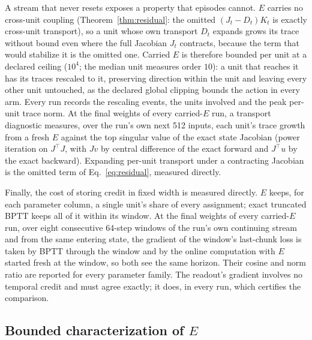 \documentclass[11pt]{article}
\theoremstyle{definition}
\begin{document}
A stream that never resets exposes a property that episodes cannot. $E$ carries
no cross-unit coupling (Theorem~\ref{thm:residual}: the omitted
$(J_t-D_t)K_t$ is exactly cross-unit transport), so a unit whose own transport
$D_t$ expands grows its trace without bound even where the full Jacobian $J_t$
contracts, because the term that would stabilize it is the omitted one. Carried $E$
is therefore bounded per unit at a declared ceiling ($10^4$; the median unit measures
order $10$): a unit that reaches it has its traces rescaled to it, preserving
direction within the unit and leaving every other unit untouched, as the declared
global clipping bounds the action in every arm. Every run records the rescaling
events, the units involved and the peak per-unit trace norm. At the final weights
of every carried-$E$ run, a transport diagnostic measures, over the run's own next
512 inputs, each unit's trace growth from a fresh $E$ against the top singular value
of the exact state Jacobian (power iteration on $J^\top J$, with $Jv$ by central
difference of the exact forward and $J^\top u$ by the exact backward). Expanding
per-unit transport under a contracting Jacobian is the omitted term of
Eq.~\eqref{eq:residual}, measured directly.

Finally, the cost of storing credit in fixed width is measured directly. $E$ keeps,
for each parameter column, a single unit's share of every assignment; exact
truncated BPTT keeps all of it within its window. At the final weights of every
carried-$E$ run, over eight consecutive 64-step windows of the run's own
continuing stream and from the same entering state, the gradient of the window's
last-chunk loss is taken by BPTT through the window and by the online computation
with $E$ started fresh at the window, so both see the same horizon. Their cosine and
norm ratio are reported for every parameter family. The readout's gradient involves
no temporal credit and must agree exactly; it does, in every run, which certifies
the comparison.

\subsection{Bounded characterization of $E$}
\label{sec:ontology}
\end{document}
